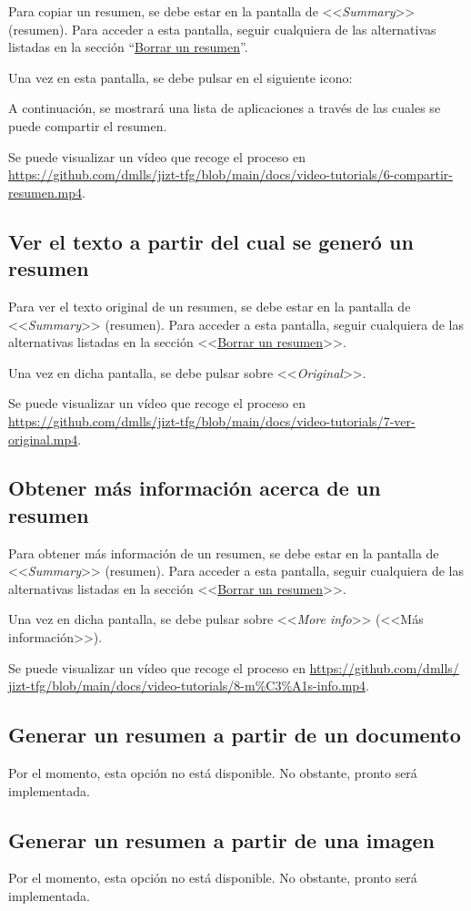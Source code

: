 Para copiar un resumen, se debe estar en la pantalla de <<\emph{Summary}>> (resumen). Para acceder a esta pantalla, seguir cualquiera de las alternativas listadas en la sección ``\hyperref[subsection:borrar]{Borrar un resumen}''.

Una vez en esta pantalla, se debe pulsar en el siguiente icono:

A continuación, se mostrará una lista de aplicaciones a través de las cuales se puede compartir el resumen.

Se puede visualizar un vídeo que recoge el proceso en \href{https://github.com/dmlls/jizt-tfg/blob/main/docs/video-tutorials/6-compartir-resumen.mp4}{https://github.com/\newline dmlls/jizt-tfg/blob/main/docs/video-tutorials/6-compartir-resumen.mp4}.

\subsection{Ver el texto a partir del cual se generó un resumen}

Para ver el texto original de un resumen, se debe estar en la pantalla de <<\emph{Summary}>> (resumen). Para acceder a esta pantalla, seguir cualquiera de las alternativas listadas en la sección <<\hyperref[subsection:borrar]{Borrar un resumen}>>.

Una vez en dicha pantalla, se debe pulsar sobre <<\emph{Original}>>.

Se puede visualizar un vídeo que recoge el proceso en \href{https://github.com/dmlls/jizt-tfg/blob/main/docs/video-tutorials/7-ver-original.mp4}{https://github.com/\newline dmlls/jizt-tfg/blob/main/docs/video-tutorials/7-ver-original.mp4}.

\subsection{Obtener más información acerca de un resumen}

Para obtener más información de un resumen, se debe estar en la pantalla de <<\emph{Summary}>> (resumen). Para acceder a esta pantalla, seguir cualquiera de las alternativas listadas en la sección <<\hyperref[subsection:borrar]{Borrar un resumen}>>.

Una vez en dicha pantalla, se debe pulsar sobre <<\emph{More info}>> (<<Más información>>).

Se puede visualizar un vídeo que recoge el proceso en \href{https://github.com/dmlls/jizt-tfg/blob/main/docs/video-tutorials/8-m\%C3\%A1s-info.mp4}{https://github.com/\newline dmlls/ jizt-tfg/blob/main/docs/video-tutorials/8-m\%C3\%A1s-info.mp4}.

\subsection{Generar un resumen a partir de un documento}

Por el momento, esta opción no está disponible. No obstante, pronto será implementada.

\subsection{Generar un resumen a partir de una imagen}

Por el momento, esta opción no está disponible. No obstante, pronto será implementada.